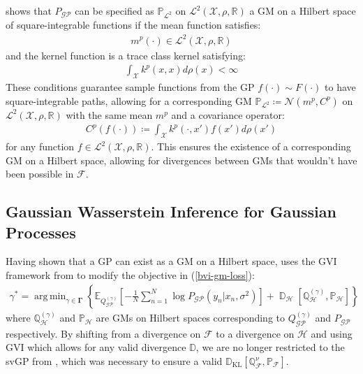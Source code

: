\documentclass{article}
\newcommand{\KLD}{\operatorname{\mathbb{D}_{\text{KL}}}}
\newcommand{\D}{\operatorname{\mathbb{D}}}
\newcommand{\GP}{\operatorname{\mathcal{GP}}}
\DeclareMathOperator*{\argmin}{arg\,min}
\numberwithin{equation}{section}
\begin{document}
\cite{wild2022generalized} shows that $P_{\GP}$ can be specified as $\mathbb{P}_{\mathcal{L}^2}$ on $\mathcal{L}^2(\mathcal{X}, \rho, \mathbb{R})$ a GM on a Hilbert space of square-integrable functions if the mean function satisfies:
\begin{align}
    \label{smooth-mean-function-condition}
    m^p(\cdot) \in \mathcal{L}^2(\mathcal{X}, \rho, \mathbb{R})
\end{align}
and the kernel function is a trace class kernel satisfying:
\begin{align}
    \int_{\mathcal{X}} k^p(x, x) d\rho(x) < \infty
    \label{trace-kernel-condition}
\end{align}
These conditions guarantee sample functions from the GP $f(\cdot) \sim F(\cdot)$ to have square-integrable paths, allowing for a corresponding GM $\mathbb{P}_{\mathcal{L}^2} \coloneqq \mathcal{N}(m^p, C^p)$ on $\mathcal{L}^2(\mathcal{X}, \rho, \mathbb{R})$ with the same mean $m^p$ and a covariance operator:
\begin{align}
    C^p(f(\cdot)) \coloneqq \int_{\mathcal{X}} k^p(\cdot, x')f(x')d \rho(x')
    \label{gm-covariance-operator}
\end{align}
for any function $f \in \mathcal{L}^2(\mathcal{X}, \rho, \mathbb{R})$. This ensures the existence of a corresponding GM on a Hilbert space, allowing for divergences between GMs that wouldn't have been possible in $\mathcal{F}$. 

\subsection{Gaussian Wasserstein Inference for Gaussian Processes}
Having shown that a GP can exist as a GM on a Hilbert space, \cite{wild2022generalized} uses the GVI framework from \cite{knoblauch2022optimization} to modify the objective in (\ref{bvi-gm-loss}):
\begin{align}
    \label{gwi-objective}
    \gamma^* = \argmin_{\gamma \in \boldsymbol{\Gamma}}\left\{ \mathbb{E}_{Q^{(\gamma)}_{\GP}}\left[- \frac{1}{N}\sum_{n=1}^N \log P_{\GP}\left(y_n \vert x_n, \sigma^2\right) \right] + \D_{\mathcal{H}} \left[\mathbb{Q}^{(\gamma)}_{\mathcal{H}}, \mathbb{P}_{\mathcal{H}} \right]\right\}
\end{align}
where $\mathbb{Q}^{(\gamma)}_{\mathcal{H}}$ and $\mathbb{P}_{\mathcal{H}}$ are GMs on Hilbert spaces corresponding to $Q^{(\gamma)}_{\GP}$ and $P_{\GP}$ respectively. By shifting from a divergence on $\mathcal{F}$ to a divergence on $\mathcal{H}$ and using GVI which allows for any valid divergence $\mathbb{D}$, we are no longer restricted to the svGP from \cite{titsias2009variational}, which was necessary to ensure a valid $\KLD\left[\mathbb{Q}^{\nu}_{\mathcal{F}},  \mathbb{P}_{\mathcal{F}}\right]$. 
\end{document}
